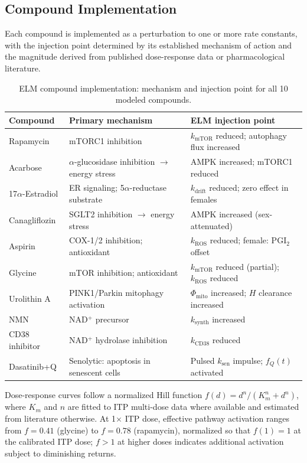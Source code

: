 \documentclass[11pt]{article}
\begin{document}
\subsection{Compound Implementation}

Each compound is implemented as a perturbation to one or more rate constants, with the injection point determined by its established mechanism of action and the magnitude derived from published dose-response data or pharmacological literature.

\begin{table}[ht]
\centering
\caption{ELM compound implementation: mechanism and injection point for all 10 modeled compounds.}
\label{tab:compounds}
\begin{tabular}{@{}lll@{}}
\toprule
Compound & Primary mechanism & ELM injection point \\
\midrule
Rapamycin & mTORC1 inhibition & $k_{\text{mTOR}}$ reduced; autophagy flux increased \\
Acarbose & $\alpha$-glucosidase inhibition $\to$ energy stress & AMPK increased; mTORC1 reduced \\
17$\alpha$-Estradiol & ER signaling; 5$\alpha$-reductase substrate & $k_{\text{drift}}$ reduced; zero effect in females \\
Canagliflozin & SGLT2 inhibition $\to$ energy stress & AMPK increased (sex-attenuated) \\
Aspirin & COX-1/2 inhibition; antioxidant & $k_{\text{ROS}}$ reduced; female: PGI$_2$ offset \\
Glycine & mTOR inhibition; antioxidant & $k_{\text{mTOR}}$ reduced (partial); $k_{\text{ROS}}$ reduced \\
Urolithin A & PINK1/Parkin mitophagy activation & $\Phi_{\text{mito}}$ increased; $H$ clearance increased \\
NMN & NAD$^+$ precursor & $k_{\text{synth}}$ increased \\
CD38 inhibitor & NAD$^+$ hydrolase inhibition & $k_{\text{CD38}}$ reduced \\
Dasatinib+Q & Senolytic: apoptosis in senescent cells & Pulsed $k_{\text{sen}}$ impulse; $f_Q(t)$ activated \\
\bottomrule
\end{tabular}
\end{table}

Dose-response curves follow a normalized Hill function $f(d) = d^n / (K_m^n + d^n)$, where $K_m$ and $n$ are fitted to ITP multi-dose data where available and estimated from literature otherwise. At 1$\times$ ITP dose, effective pathway activation ranges from $f = 0.41$ (glycine) to $f = 0.78$ (rapamycin), normalized so that $f(1) = 1$ at the calibrated ITP dose; $f > 1$ at higher doses indicates additional activation subject to diminishing returns.
\end{document}
